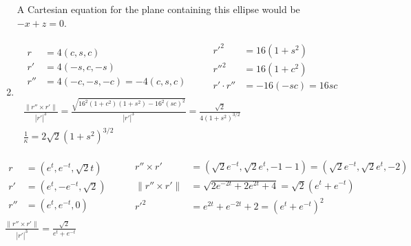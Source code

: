 \documentclass[twoside]{amsart}
\theoremstyle{plain}
\theoremstyle{definition}
\newcommand{\exercisehead}[1]
  {\smallskip
   \noindent{\small\bf Exercise #1.}}
\begin{document}
\begin{enumerate}
A Cartesian equation for the plane containing this ellipse would be $\boxed{ -x + z = 0}$.
\item 
\[
\begin{gathered}
  \begin{aligned}
    r & = 4(c,s,c) \\
    r' & = 4(-s,c,-s) \\
    r'' & = 4(-c,-s,-c) = -4 (c,s,c)
  \end{aligned} \quad \quad 
\begin{aligned}
  r'^2 & = 16 ( 1 + s^2) \\
  r''^2 & = 16 ( 1 +c^2 ) \\
  r' \cdot r'' & = -16 (-sc) = 16sc
\end{aligned} \\
\frac{ \| r'' \times r' \| }{ |r'|^3} = \frac{ \sqrt{ 16^2 ( 1 + c^2)(1+s^2) - 16^2 (sc)^2 } }{ |r'|^3 } = \frac{ \sqrt{2}}{ 4 (1+s^2)^{3/2} } \\
\boxed{ \frac{1}{\kappa} = 2\sqrt{2} ( 1 + s^2)^{3/2} }
\end{gathered}
\]
\end{enumerate}

\exercisehead{5} 
\[
\begin{gathered}
  \begin{aligned}
    r & = (e^t, e^{-t}, \sqrt{2} t ) \\
    r' & = (e^t, -e^{-t}, \sqrt{2} ) \\
    r'' & = (e^t, e^{-t}, 0)
\end{aligned} \quad \quad \, 
\begin{aligned}
  r'' \times r' & = (\sqrt{2} e^{-t}, \sqrt{2} e^{t}, -1 -1) = (\sqrt{2} e^{-t}, \sqrt{2} e^{t}, -2 ) \\
  \| r'' \times r' \| & = \sqrt{ 2 e^{-2t} + 2 e^{2t} + 4 } = \sqrt{2} (e^t + e^{-t} ) \\
  r'^2 & = e^{2t} + e^{-2t} + 2 = (e^t + e^{-t})^2 
\end{aligned} \\
\boxed{ \frac{ \| r'' \times r' \| }{ | r'|^3} = \frac{ \sqrt{2}}{ e^t + e^{-t} } }
\end{gathered}
\]
\end{document}
